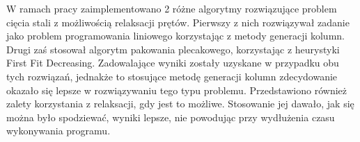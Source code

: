 W ramach pracy zaimplementowano 2 różne algorytmy rozwiązujące problem cięcia stali z możliwością relaksacji prętów. Pierwszy z nich rozwiązywał zadanie jako problem programowania liniowego korzystając z metody generacji kolumn. Drugi zaś stosował algorytm pakowania plecakowego, korzystając z heurystyki First Fit Decreasing. Zadowalające wyniki zostały uzyskane w przypadku obu tych rozwiązań, jednakże to stosujące metodę generacji kolumn zdecydowanie okazało się lepsze w rozwiązywaniu tego typu problemu. Przedstawiono również zalety korzystania z relaksacji, gdy jest to możliwe. Stosowanie jej dawało, jak się można było spodziewać, wyniki lepsze, nie powodując przy wydłużenia czasu wykonywania programu.